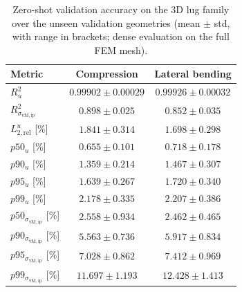\begin{table}[t]
\centering
\caption{Zero-shot validation accuracy on the 3D lug family over the unseen validation geometries (mean $\pm$ std, with range in brackets; dense evaluation on the full FEM mesh).}
\label{tab:lug_val_metrics}
\small
\begin{tabular}{lcc}
\toprule
Metric & Compression & Lateral bending \\
\midrule
$R^2_u$
& $0.99902 \pm 0.00029$ \; [$0.99834,\,0.99952$]
& $0.99926 \pm 0.00032$ \; [$0.99845,\,0.99960$] \\
$R^2_{\sigma_{\mathrm{vM,ip}}}$
& $0.898 \pm 0.025$ \; [$0.841,\,0.929$]
& $0.852 \pm 0.035$ \; [$0.797,\,0.895$] \\
$L_{2,\mathrm{rel}}^u$ [\%]
& $1.841 \pm 0.314$ \; [$1.305,\,2.636$]
& $1.698 \pm 0.298$ \; [$1.282,\,2.366$] \\
$p50_u$ [\%]
& $0.655 \pm 0.101$ \; [$0.464,\,0.899$]
& $0.718 \pm 0.178$ \; [$0.533,\,1.154$] \\
$p90_u$ [\%]
& $1.359 \pm 0.214$ \; [$0.953,\,1.874$]
& $1.467 \pm 0.307$ \; [$1.110,\,2.192$] \\
$p95_u$ [\%]
& $1.639 \pm 0.267$ \; [$1.153,\,2.293$]
& $1.720 \pm 0.340$ \; [$1.311,\,2.511$] \\
$p99_u$ [\%]
& $2.178 \pm 0.335$ \; [$1.631,\,3.024$]
& $2.207 \pm 0.386$ \; [$1.737,\,3.061$] \\
$p50_{\sigma_{\mathrm{vM,ip}}}$ [\%]
& $2.558 \pm 0.934$ \; [$1.357,\,4.359$]
& $2.462 \pm 0.465$ \; [$1.910,\,3.378$] \\
$p90_{\sigma_{\mathrm{vM,ip}}}$ [\%]
& $5.563 \pm 0.736$ \; [$4.697,\,6.914$]
& $5.917 \pm 0.834$ \; [$4.989,\,8.000$] \\
$p95_{\sigma_{\mathrm{vM,ip}}}$ [\%]
& $7.028 \pm 0.862$ \; [$5.679,\,8.744$]
& $7.412 \pm 0.969$ \; [$6.397,\,10.146$] \\
$p99_{\sigma_{\mathrm{vM,ip}}}$ [\%]
& $11.697 \pm 1.193$ \; [$9.139,\,13.753$]
& $12.428 \pm 1.413$ \; [$11.001,\,16.116$] \\
\bottomrule
\end{tabular}
\end{table}


